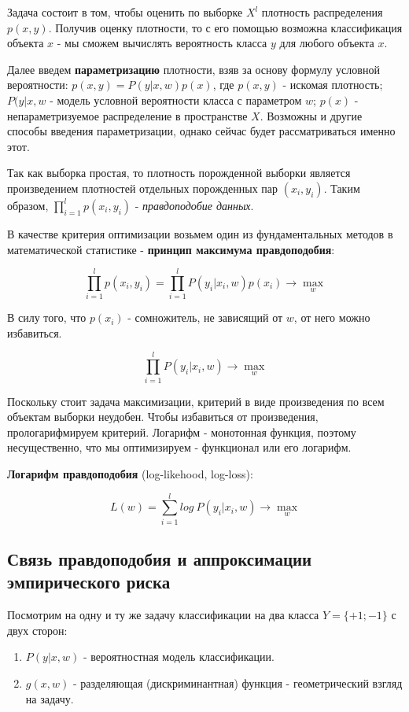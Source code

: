 Задача состоит в том, чтобы оценить по выборке \(X^{l}\) плотность распределения \(p(x,y)\). Получив оценку плотности, то с его помощью возможна классификация объекта \(x\) - мы сможем вычислять вероятность класса \(y\) для любого объекта \(x\).

Далее введем \textbf{параметризацию} плотности, взяв за основу формулу условной вероятности: \(p(x,y) = P(y | x,w)p(x)\), где \(p(x,y)\) - искомая плотность; \(P(y|x,w\) - модель условной вероятности класса с параметром \(w\); \(p(x)\) - непараметризуемое распределение в пространстве \(X\). Возможны и другие способы введения параметризации, однако сейчас будет рассматриваться именно этот.

Так как выборка простая, то плотность порожденной выборки является произведением плотностей отдельных порожденных пар \((x_{i}, y_{i})\). Таким образом, \(\prod_{i=1}^{l}{p(x_{i},y_{i})}\) - \textit{правдоподобие данных}.

В качестве критерия оптимизации возьмем один из фундаментальных методов в математической статистике - \textbf{принцип максимума правдоподобия}:

\[
\prod_{i=1}^{l}{p(x_{i},y_{i})} = \prod_{i=1}^{l}{P(y_{i}|x_{i},w)p(x_{i})} \xrightarrow{} \max_{w}
\]

В силу того, что \(p(x_{i})\) - сомножитель, не зависящий от \(w\), от него можно избавиться.

\[
\prod_{i=1}^{l}{P(y_{i}|x_{i},w)} \xrightarrow{} \max_{w}
\]

Поскольку стоит задача максимизации, критерий в виде произведения по всем объектам выборки неудобен. Чтобы избавиться от произведения, прологарифмируем критерий. Логарифм - монотонная функция, поэтому несущественно, что мы оптимизируем - функционал или его логарифм.

\textbf{Логарифм правдоподобия} (log-likehood, log-loss):

\[
L(w) = \sum_{i=1}^{l}{log \ P(y_{i}|x_{i},w)} \xrightarrow{} \max_{w}
\]

\subsection{Связь правдоподобия и аппроксимации эмпирического риска}

Посмотрим на одну и ту же задачу классификации на два класса \(Y = \{+1; -1\}\) с двух сторон:
\begin{enumerate}
    \item \(P(y|x,w)\) - вероятностная модель классификации.
    \item \(g(x,w)\) - разделяющая (дискриминантная) функция - геометрический взгляд на задачу.
\end{enumerate}


